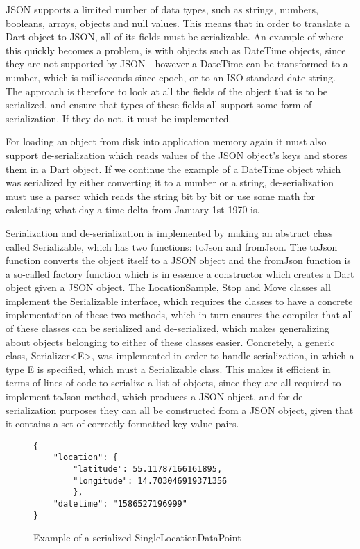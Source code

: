 JSON supports a limited number of data types, such as strings, numbers, booleans, arrays, objects and null values. This means that in order to translate a Dart object to JSON, all of its fields must be serializable. An example of where this quickly becomes a problem, is with objects such as DateTime objects, since they are not supported by JSON - however a DateTime can be transformed to a number, which is milliseconds since epoch, or to an ISO standard date string. The approach is therefore to look at all the fields of the object that is to be serialized, and ensure that types of these fields all support some form of serialization. If they do not, it must be implemented.

For loading an object from disk into application memory again it must also support de-serialization which reads values of the JSON object's keys and stores them in a Dart object. If we continue the example of a DateTime object which was serialized by either converting it to a number or a string, de-serialization must use a parser which reads the string bit by bit or use some math for calculating what day a time delta from January 1st 1970 is. 

Serialization and de-serialization is implemented by making an abstract class called Serializable, which has two functions: toJson and fromJson. The toJson function converts the object itself to a JSON object and the fromJson function is a so-called factory function which is in essence a constructor which creates a Dart object given a JSON object. The LocationSample, Stop and Move classes all implement the Serializable interface, which requires the classes to have a concrete implementation of these two methods, which in turn ensures the compiler that all of these classes can be serialized and de-serialized, which makes generalizing about objects belonging to either of these classes easier. Concretely, a generic class, Serializer<E>, was implemented in order to handle serialization, in which a type E is specified, which must a Serializable class. This makes it efficient in terms of lines of code to serialize a list of objects, since they are all required to implement toJson method, which produces a JSON object, and for de-serialization purposes they can all be constructed from a JSON object, given that it contains a set of correctly formatted key-value pairs.


\begin{figure}
    \centering
\begin{verbatim}
{
    "location": {
        "latitude": 55.11787166161895,
        "longitude": 14.703046919371356
        },
    "datetime": "1586527196999"
}
\end{verbatim}
    \caption{Example of a serialized SingleLocationDataPoint}
    \label{fig:serialized_point}
\end{figure}

